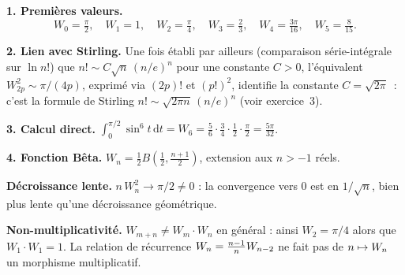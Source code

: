 \decsep{}



\begin{mdframed}[style=exbar]
  \textbf{1. Premières valeurs.}
  \[
    W_0=\tfrac{\pi}{2},\quad W_1=1,\quad W_2=\tfrac{\pi}{4},\quad
    W_3=\tfrac{2}{3},\quad W_4=\tfrac{3\pi}{16},\quad W_5=\tfrac{8}{15}.
  \]

  \smallskip\noindent
  \textbf{2. Lien avec Stirling.}
  Une fois établi par ailleurs (comparaison série-intégrale sur $\ln n!$)
  que $n!\sim C\sqrt{n}\,{(n/e)}^n$ pour une constante $C>0$, l'équivalent
  $W_{2p}^2\sim\pi/(4p)$, exprimé via $(2p)!$ et ${(p!)}^2$, identifie la
  constante $C=\sqrt{2\pi}$~: c'est la formule de Stirling
  $n!\sim\sqrt{2\pi n}\,{(n/e)}^n$ (voir exercice~3).

  \smallskip\noindent
  \textbf{3. Calcul direct.}
  $\displaystyle\int_0^{\pi/2}\sin^6 t\,\mathrm{d}t = W_6 = \tfrac{5}{6}\cdot\tfrac{3}{4}\cdot\tfrac{1}{2}\cdot\tfrac{\pi}{2} = \tfrac{5\pi}{32}$.

  \smallskip\noindent
  \textbf{4. Fonction Bêta.}
  $W_n = \tfrac{1}{2}B\!\left(\tfrac{1}{2},\tfrac{n+1}{2}\right)$, extension aux $n > -1$ réels.
\end{mdframed}

\vspace{6pt}

\begin{mdframed}[style=cexbar]
  \textbf{Décroissance lente.}\enspace%
  $n\,W_n^2\to\pi/2\neq 0$ : la convergence vers $0$ est en $1/\sqrt{n}$,
  bien plus lente qu'une décroissance géométrique.

  \smallskip\noindent
  \textbf{Non-multiplicativité.}\enspace%
  $W_{m+n}\neq W_m\cdot W_n$ en général : ainsi $W_2 = \pi/4$ alors que
  $W_1\cdot W_1 = 1$. La relation de récurrence
  $W_n = \frac{n-1}{n}W_{n-2}$ ne fait pas de $n\mapsto W_n$ un
  morphisme multiplicatif.
\end{mdframed}

\vspace{6pt}
\exolabel

